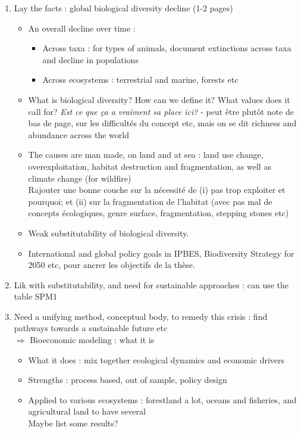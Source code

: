 \begin{enumerate}
\item Lay the facts : global biological diversity decline (1-2 pages)
\begin{itemize}

\item An overall decline over time : 
\begin{itemize}
\item Across taxa : for types of animals, document extinctions across taxa and decline in populations
\item Across ecosystems : terrestrial and marine, forests etc
\end{itemize}

\item What is biological diversity? How can we define it? What values does it call for? \textit{Est ce que ça a vraiment sa place ici?} - peut être plutôt note de bas de page, sur les difficultés du concept etc, mais on se dit richness and abundance across the world

\item The causes are man made, on land and at sea : land use change, overexploitation, habitat destruction and fragmentation, as well as climate change (for wildfire)
\\
Rajouter une bonne couche sur la nécessité de (i) pas trop exploiter et pourquoi; et (ii) sur la fragmentation de l'habitat (avec pas mal de concepts écologiques, genre surface, fragmentation, stepping stones etc)
\item Weak substitutability of biological diversity.\\
\item International and global policy goals in IPBES, Biodiversity Strategy for 2050 etc, pour ancrer les objectifs de la thèse.
\end{itemize}

\item Lik with substitutability, and need for sustainable approaches : can use the table SPM1

\item Need a unifying method, conceptual body, to remedy this crisis : find pathways towards a sustainable future etc\\
$\Rightarrow$ Bioeconomic modeling : what it is

\begin{itemize}
\item What it does : mix together ecological dynamics and economic drivers
\item Strengths : process based, out of sample, policy design
\item Applied to various ecosystems : forestland a lot, oceans and fisheries, and agricultural land to have several \\
Maybe list some results?
\end{itemize}


\end{enumerate}
